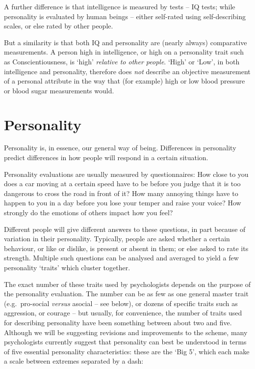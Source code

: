 \documentclass[
]{book}
\begin{document}
A further difference is that intelligence is measured by tests -- IQ tests; while personality is evaluated by human beings -- either self-rated using self-describing scales, or else rated by other people.

But a similarity is that both IQ and personality are (nearly always) comparative measurements. A person high in intelligence, or high on a personality trait such as Conscientiousness, is `high' \emph{relative to other people}. `High' or `Low', in both intelligence and personality, therefore does \emph{not} describe an objective measurement of a personal attribute in the way that (for example) high or low blood pressure or blood sugar measurements would.

\hypertarget{personality}{%
\section{Personality}\label{personality}}

Personality is, in essence, our general way of being. Differences in personality predict differences in how people will respond in a certain situation.

Personality evaluations are usually measured by questionnaires: How close to you does a car moving at a certain speed have to be before you judge that it is too dangerous to cross the road in front of it? How many annoying things have to happen to you in a day before you lose your temper and raise your voice? How strongly do the emotions of others impact how you feel?

Different people will give different answers to these questions, in part because of variation in their personality. Typically, people are asked whether a certain behaviour, or like or dislike, is present or absent in them; or else asked to rate its strength. Multiple such questions can be analysed and averaged to yield a few personality `traits' which cluster together.

The exact number of these traits used by psychologists depends on the purpose of the personality evaluation. The number can be as few as one general master trait (e.g.~pro-social \emph{versus} asocial -- see below), or dozens of specific traits such as aggression, or courage -- but usually, for convenience, the number of traits used for describing personality have been something between about two and five.
Although we will be suggesting revisions and improvements to the scheme, many psychologists currently suggest that personality can best be understood in terms of five essential personality characteristics: these are the `Big 5', which each make a scale between extremes separated by a dash:
\end{document}
